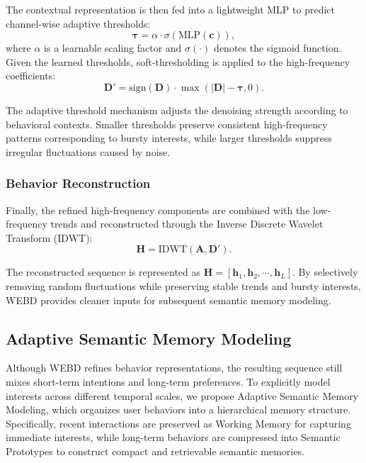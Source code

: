 \documentclass[letterpaper]{article} %
\theoremstyle{definition} %
\begin{document}
The contextual representation is then fed into a lightweight MLP to predict channel-wise adaptive thresholds:
\begin{equation}
\boldsymbol{\tau} = \alpha \cdot \sigma\left(\text{MLP}\!\left(\bm{c}\right)\right),
\end{equation}
where $\alpha$ is a learnable scaling factor and $\sigma(\cdot)$ denotes the sigmoid function. Given the learned thresholds, soft-thresholding is applied to the high-frequency coefficients:
\begin{equation}
\bm{D}' = \text{sign}(\bm{D}) \cdot \max(|\bm{D}|-\boldsymbol{\tau},0).
\end{equation}

The adaptive threshold mechanism adjusts the denoising strength according to behavioral contexts. Smaller thresholds preserve consistent high-frequency patterns corresponding to bursty interests, while larger thresholds suppress irregular fluctuations caused by noise.

\subsubsection{Behavior Reconstruction}

Finally, the refined high-frequency components are combined with the low-frequency trends and reconstructed through the Inverse Discrete Wavelet Transform (IDWT):
\begin{equation}
\bm{H} = \text{IDWT}(\bm{A},\bm{D}').
\end{equation}

The reconstructed sequence is represented as $\bm{H}=[\bm{h}_1,\bm{h}_2,\cdots,\bm{h}_L]$. By selectively removing random fluctuations while preserving stable trends and bursty interests, WEBD provides cleaner inputs for subsequent semantic memory modeling.

\subsection{Adaptive Semantic Memory Modeling}

Although WEBD refines behavior representations, the resulting sequence still mixes short-term intentions and long-term preferences. To explicitly model interests across different temporal scales, we propose Adaptive Semantic Memory Modeling, which organizes user behaviors into a hierarchical memory structure. Specifically, recent interactions are preserved as Working Memory for capturing immediate interests, while long-term behaviors are compressed into Semantic Prototypes to construct compact and retrievable semantic memories.
\end{document}
